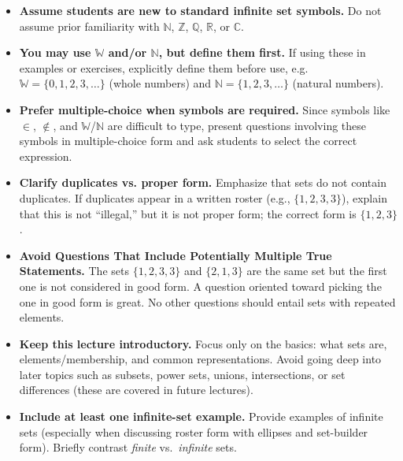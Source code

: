 \begin{itemize}
  \item \textbf{Assume students are new to standard infinite set symbols.} Do not assume prior familiarity with $\mathbb{N}$, $\mathbb{Z}$, $\mathbb{Q}$, $\mathbb{R}$, or $\mathbb{C}$.

  \item \textbf{You may use $\mathbb{W}$ and/or $\mathbb{N}$, but define them first.} If using these in examples or exercises, explicitly define them before use, e.g.
  $\mathbb{W} = \{0,1,2,3,\ldots\}$ (whole numbers) and
  $\mathbb{N} = \{1,2,3,\ldots\}$ (natural numbers).

  \item \textbf{Prefer multiple-choice when symbols are required.} Since symbols like $\in$, $\notin$, and $\mathbb{W}$/$\mathbb{N}$ are difficult to type, present questions involving these symbols in multiple-choice form and ask students to select the correct expression.

  \item \textbf{Clarify duplicates vs. proper form.} Emphasize that sets do not contain duplicates. If duplicates appear in a written roster (e.g., $\{1,2,3,3\}$), explain that this is not “illegal,” but it is not proper form; the correct form is $\{1,2,3\}$.
  \item \textbf{Avoid Questions That Include Potentially Multiple True Statements.}  The sets $\{1,2,3,3\}$ and $\{2,1,3\}$ are the same set but the first one is not considered in good form. A question oriented toward picking the one in good form is great.  No other questions should entail sets with repeated elements.

  \item \textbf{Keep this lecture introductory.} Focus only on the basics: what sets are, elements/membership, and common representations. Avoid going deep into later topics such as subsets, power sets, unions, intersections, or set differences (these are covered in future lectures).

  \item \textbf{Include at least one infinite-set example.} Provide examples of infinite sets (especially when discussing roster form with ellipses and set-builder form). Briefly contrast \textit{finite} vs.\ \textit{infinite} sets.


\end{itemize}
